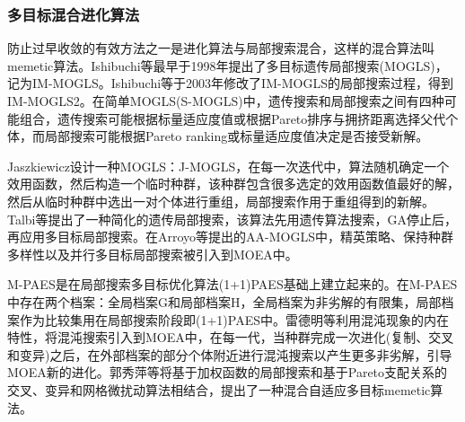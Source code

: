         \subsubsection{多目标混合进化算法}
            \par
            防止过早收敛的有效方法之一是进化算法与局部搜索混合，这样的混合算法叫memetic算法。Ishibuchi等最早于1998年提出了多目标遗传局部搜索(MOGLS)，记为IM-MOGLS。Ishibuchi等于2003年修改了IM-MOGLS的局部搜索过程，得到IM-MOGLS2。在简单MOGLS(S-MOGLS)中，遗传搜索和局部搜索之间有四种可能组合，遗传搜索可能根据标量适应度值或根据Pareto排序与拥挤距离选择父代个体，而局部搜索可能根据Pareto ranking或标量适应度值决定是否接受新解。
            \par
            Jaszkiewicz设计一种MOGLS：J-MOGLS，在每一次迭代中，算法随机确定一个效用函数，然后构造一个临时种群，该种群包含很多选定的效用函数值最好的解，然后从临时种群中选出一对个体进行重组，局部搜索作用于重组得到的新解。Talbi等提出了一种简化的遗传局部搜索，该算法先用遗传算法搜索，GA停止后，再应用多目标局部搜索。在Arroyo等提出的AA-MOGLS中，精英策略、保持种群多样性以及并行多目标局部搜索被引入到MOEA中。
            \par
            M-PAES是在局部搜索多目标优化算法(1+1)PAES基础上建立起来的。在M-PAES中存在两个档案：全局档案G和局部档案H，全局档案为非劣解的有限集，局部档案作为比较集用在局部搜索阶段即(1+1)PAES中。雷德明等利用混沌现象的内在特性，将混沌搜索引入到MOEA中，在每一代，当种群完成一次进化(复制、交叉和变异)之后，在外部档案的部分个体附近进行混沌搜索以产生更多非劣解，引导MOEA新的进化。郭秀萍等将基于加权函数的局部搜索和基于Pareto支配关系的交叉、变异和网格微扰动算法相结合，提出了一种混合自适应多目标memetic算法。
